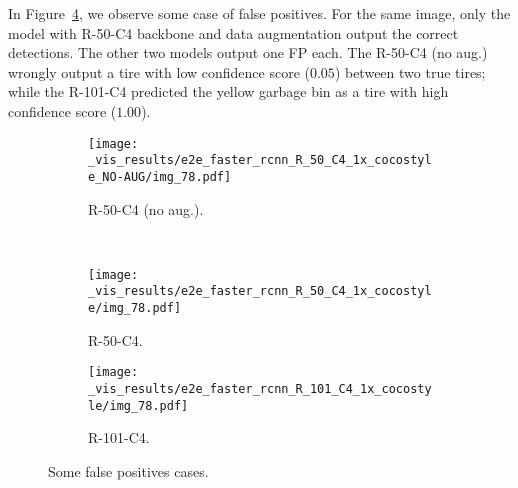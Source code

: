%
%
In Figure~\ref{fig:FP_cases}, we observe some case of false positives.
For the same image, only the model with R-50-C4 backbone and data augmentation output the correct detections.
The other two models output one FP each. The R-50-C4 (no aug.) wrongly output a tire with low confidence score ($0.05$) between two true tires; while the R-101-C4 predicted the yellow garbage bin as a tire with high confidence score ($1.00$).
%
\begin{figure}[ht!]
  \centering
  \begin{subfigure}[t]{.85\linewidth}
    \centering
    \texttt{[image: \_vis\_results/e2e\_faster\_rcnn\_R\_50\_C4\_1x\_cocostyle\_NO-AUG/img\_78.pdf]}
    \caption{R-50-C4 (no aug.).}
    \label{fig:FP_cases_50N}
  \end{subfigure}\\
  \begin{subfigure}[t]{0.85\linewidth}
    \centering
    \texttt{[image: \_vis\_results/e2e\_faster\_rcnn\_R\_50\_C4\_1x\_cocostyle/img\_78.pdf]}
    \caption{R-50-C4.}
    \label{fig:FP_cases_50}
  \end{subfigure}
  \begin{subfigure}[t]{0.85\linewidth}
    \centering
    \texttt{[image: \_vis\_results/e2e\_faster\_rcnn\_R\_101\_C4\_1x\_cocostyle/img\_78.pdf]}
    \caption{R-101-C4.}
    \label{fig:FP_cases_101}
  \end{subfigure}
  \caption{Some false positives cases.}
  \label{fig:FP_cases}
\end{figure}
